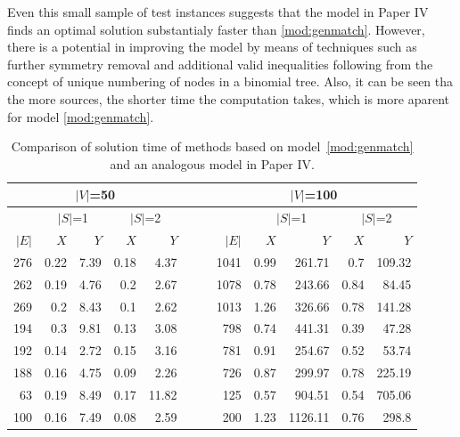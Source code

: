 Even this small sample of test instances suggests that the model in Paper IV finds an optimal solution substantialy faster than \eqref{mod:genmatch}.
However, there is a potential in improving the model by means of techniques such as further symmetry removal
and additional valid inequalities following from the concept of unique numbering of nodes in a binomial tree.
Also, it can be seen tha the more sources, the shorter time the computation takes, which is more aparent for model \eqref{mod:genmatch}.
\begin{table}[h]
\begin{centering}
\begin{tabular}{rrrrrrrrrrr}
\multicolumn{5}{c}{$|V|$=50}                                      &~~  & \multicolumn{5}{c}{$|V|$=100}                                     \\\hline
      & \multicolumn{2}{c}{$|S|$=1} & \multicolumn{2}{c}{$|S|$=2} &~~  &       & \multicolumn{2}{c}{$|S|$=1} & \multicolumn{2}{c}{$|S|$=2} \\\hline
$|E|$ & $X$          & $Y$          & $X$          & $Y$          &~~  & $|E|$ & $X$         & $Y$           & $X$         & $Y$           \\\hline
276   & 0.22         & 7.39         & 0.18         & 4.37         &~~  & 1041  & 0.99        & 261.71        & 0.7         & 109.32        \\
262   & 0.19         & 4.76         & 0.2          & 2.67         &~~  & 1078  & 0.78        & 243.66        & 0.84        & 84.45         \\
269   & 0.2          & 8.43         & 0.1          & 2.62         &~~  & 1013  & 1.26        & 326.66        & 0.78        & 141.28        \\
194   & 0.3          & 9.81         & 0.13         & 3.08         &~~  & 798   & 0.74        & 441.31        & 0.39        & 47.28         \\
192   & 0.14         & 2.72         & 0.15         & 3.16         &~~  & 781   & 0.91        & 254.67        & 0.52        & 53.74         \\
188   & 0.16         & 4.75         & 0.09         & 2.26         &~~  & 726   & 0.87        & 299.97        & 0.78        & 225.19        \\
63    & 0.19         & 8.49         & 0.17         & 11.82        &~~  & 125   & 0.57        & 904.51        & 0.54        & 705.06        \\
100   & 0.16         & 7.49         & 0.08         & 2.59         &~~  & 200   & 1.23        & 1126.11       & 0.76        & 298.8        
\end{tabular}
\caption{Comparison of solution time of methods based on model~\eqref{mod:genmatch} and an analogous model in Paper IV.}
\label{tab:xvsy}
\end{centering}
\end{table}

